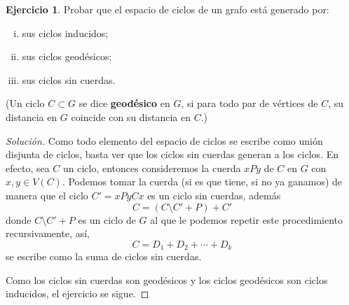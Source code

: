 \documentclass[12pt]{report}
\theoremstyle{plain}
\theoremstyle{definition}
\newtheorem{exercise}[theorem]{Ejercicio}
\newenvironment{solution}{\begin{proof}[Solución]}{\end{proof}}
\begin{document}
\begin{exercise}
Probar que el espacio de ciclos de un grafo está generado por:
\begin{enumerate}[(i)]
\item sus ciclos inducidos;
\item sus ciclos geodésicos;
\item sus ciclos sin cuerdas.
\end{enumerate}
(Un ciclo $C \subset G$ se dice \textbf{geodésico} en $G$, si para todo par de vértices de $C$, su distancia en $
G$ coincide con su distancia en $C$.)
\end{exercise}
\begin{solution}
Como todo elemento del espacio de ciclos se escribe como unión disjunta de ciclos, basta ver que los ciclos
sin cuerdas generan a los ciclos. En efecto, sea $C$ un ciclo, entonces consideremos la cuerda $xPy$ de $C$ en $G$
con $x,
y \in V(C)$. Podemos tomar la cuerda (si es que tiene, si no ya ganamos) de manera que el ciclo $C' = xPyCx$ es un
ciclo sin cuerdas, además
\[
    C = (C \setminus C' + P) + C'
\]
donde $C \setminus C' + P$ es un ciclo de $G$ al que le podemos repetir este procedimiento
recursivamente, así,
\[
    C = D_1 + D_2 + \cdots + D_k
\]
se escribe como la suma de ciclos sin cuerdas.

Como los ciclos sin cuerdas son geodésicos y los ciclos geodésicos son ciclos inducidos, el ejercicio se sigue.
\end{solution}
\end{document}
